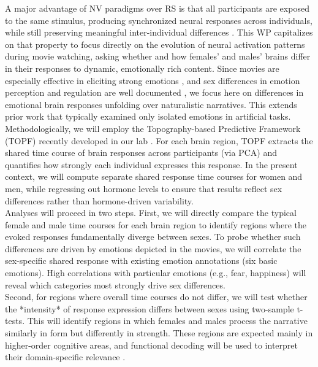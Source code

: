 \documentclass[11pt,a4paper]{article}
\begin{document}
A major advantage of NV paradigms over RS is that all participants are exposed to the same stimulus, 
producing synchronized neural responses across individuals, while still preserving meaningful inter-individual 
differences \parencite{finnIdiosynchronySharedResponses2020a,vanderwalIndividualDifferencesFunctional2017}. 
This WP capitalizes on that property to focus directly on the evolution of neural activation patterns 
during movie watching, asking whether and how females' and males' brains differ in their responses 
to dynamic, emotionally rich content. Since movies are especially effective in eliciting 
strong emotions \parencite{grossEmotionElicitationUsing1995,westermannRelativeEffectivenessValidity1996}, 
and sex differences in emotion perception and regulation are well documented 
\parencite{domesNeuralCorrelatesSex2010a,gardenerSexDifferencesEmotion2013a}, 
we focus here on differences in emotional brain responses unfolding over naturalistic narratives. 
This extends prior work that typically examined only isolated emotions in artificial tasks.\\  

Methodologically, we will employ the Topography-based Predictive Framework (TOPF) recently 
developed in our lab \parencite{liTopographybasedPredictiveFramework2023a}. For each brain region, 
TOPF extracts the shared time course of brain responses across participants (via PCA) and quantifies how 
strongly each individual expresses this response. In the present context, we will compute separate 
shared response time courses for women and men, while regressing out hormone levels to ensure that 
results reflect sex differences rather than hormone-driven variability.\\ 

Analyses will proceed in two steps. First, we will directly compare the typical female and male time courses 
for each brain region to identify regions where the evoked responses fundamentally diverge between sexes. 
To probe whether such differences are driven by emotions depicted in the movies, we will correlate the 
sex-specific shared response with existing emotion annotations (six basic emotions). 
High correlations with particular emotions (e.g., fear, happiness) will reveal which 
categories most strongly drive sex differences.\\
Second, for regions where overall time courses do not differ, we will test whether the *intensity* of 
response expression differs between sexes using two-sample t-tests. This will identify regions in which 
females and males process the narrative similarly in form but differently in strength. 
These regions are expected mainly in higher-order cognitive areas, and functional decoding will be
used to interpret their domain-specific relevance \parencite{foxMetaanalysisHumanNeuroimaging2014a}.\\  
\end{document}
